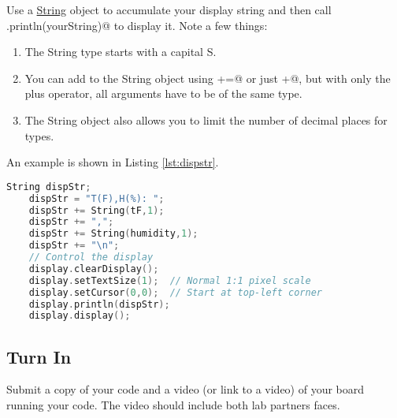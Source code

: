 Use a \href{https://www.arduino.cc/reference/en/language/variables/data-types/stringobject/}{String} 
object to accumulate your display string and then call \lstinline@display.println(yourString)@ 
to display it. Note a few things:
\begin{enumerate}
	\item The String type starts with a capital S.
	\item You can add to the String object using \lstinline@+=@ or just \lstinline@+@, 
		but with only the plus operator, all arguments have to be of the same type. 
	\item The String object also allows you to limit the number of decimal places for \lstinline@float@ types. 
\end{enumerate}
An example is shown in Listing \ref{lst:dispstr}.
\begin{lstlisting}[caption={This is an example of using a String 
		object to display text and float variables. The floats are 
		limited to 1 decimal place such that 7.123 would be displayed as 7.1.},
		label={lst:dispstr},language=C++]
	String dispStr;
	dispStr = "T(F),H(%): ";
	dispStr += String(tF,1);
	dispStr += ",";
	dispStr += String(humidity,1);
	dispStr += "\n";
	// Control the display  
	display.clearDisplay();
	display.setTextSize(1);  // Normal 1:1 pixel scale
	display.setCursor(0,0);  // Start at top-left corner
	display.println(dispStr);
	display.display();
\end{lstlisting}

\subsection{Turn In}
Submit a copy of your code and a video (or link to a video) of your board running your code. The 
video should include both lab partners faces.